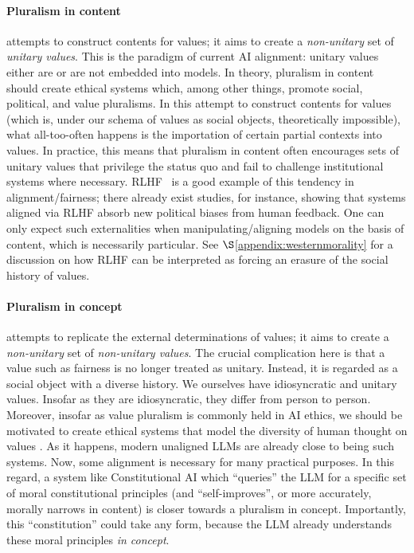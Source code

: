 \paragraph{Pluralism in content} attempts to construct contents for values; it aims to create a \textit{non-unitary} set of \textit{unitary values}.
This is the paradigm of current AI alignment: unitary values either are or are not embedded into models.
In theory, pluralism in content should create ethical systems which, among other things, promote social, political, and value pluralisms.
In this attempt to construct contents for values (which is, under our schema of values as social objects, theoretically impossible), what all-too-often happens is the importation of certain partial contexts into values.
In practice, this means that pluralism in content often encourages sets of unitary values that privilege the status quo and fail to challenge institutional systems where necessary.
RLHF~\citep{Bai2022TrainingAH} is a good example of this tendency in alignment/fairness; there already exist studies, for instance, showing that systems aligned via RLHF absorb new political biases \citep{Casper:OpenProblemsRLHF} from human feedback.
One can only expect such externalities when manipulating/aligning models on the basis of content, which is necessarily particular.
See $\S$\ref{appendix:westernmorality} for a discussion on how RLHF can be interpreted as forcing an erasure of the social history of values.

\paragraph{Pluralism in concept} attempts to replicate the external determinations of values; it aims to create a \textit{non-unitary} set of \textit{non-unitary values}.
The crucial complication here is that a value such as fairness is no longer treated as unitary. Instead, it is regarded as a social object with a diverse history.
We ourselves have idiosyncratic and unitary values. Insofar as they are idiosyncratic, they differ from person to person. Moreover, insofar as value pluralism is commonly held in AI ethics, we should be motivated to create ethical systems that model the diversity of human thought on values \citep{Sorensen:ValueKaleidoscope}. As it happens, modern unaligned LLMs are already close to being such systems. Now, some alignment is necessary for many practical purposes.
In this regard, a system like Constitutional AI \citep{Bai:ConstitutionalAI} which ``queries'' the LLM for a specific set of moral constitutional principles (and ``self-improves'', or more accurately, morally narrows in content) is closer towards a pluralism in concept. Importantly, this ``constitution'' could take any form, because the LLM already understands these moral principles \textit{in concept}.

